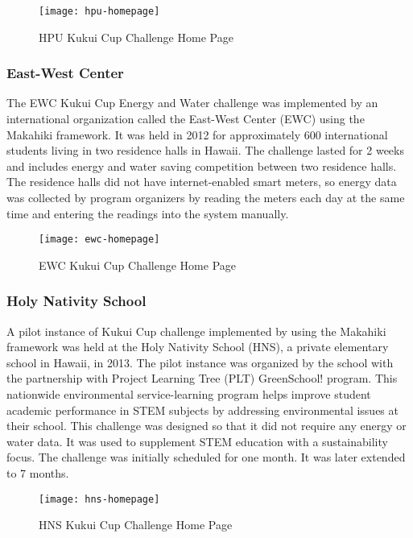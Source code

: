 \begin{figure}[ht!]
   \centering
   \texttt{[image: hpu-homepage]}
   \caption{HPU Kukui Cup Challenge Home Page}
   \label{fig:hpu-homepage}
\end{figure}

\subsubsection{East-West Center}

The EWC Kukui Cup Energy and Water challenge was implemented by an international organization called the East-West Center (EWC) using the Makahiki framework. It was held in 2012 for approximately 600 international students living in two residence halls in Hawaii. The challenge lasted for 2 weeks and includes energy and water saving competition between two residence halls. The residence halls did not have internet-enabled smart meters, so energy data was collected by program organizers by reading the meters each day at the same time and entering the readings into the system manually.

\begin{figure}[ht!]
   \centering
   \texttt{[image: ewc-homepage]}
   \caption{EWC Kukui Cup Challenge Home Page}
   \label{fig:ewc-homepage}
\end{figure}

\subsubsection{Holy Nativity School}

A pilot instance of Kukui Cup challenge implemented by using the Makahiki framework was held at the Holy Nativity School (HNS), a private elementary school in Hawaii, in 2013. The pilot instance was organized by the school with the partnership with Project Learning Tree (PLT) GreenSchool! program\cite{plt-greenschools}. This nationwide environmental service-learning program helps improve student academic performance in STEM subjects by addressing environmental issues at their school. This challenge was designed so that it did not require any energy or water data. It was used to supplement STEM education with a sustainability focus. The challenge was initially scheduled for one month. It was later extended to 7 months.

\begin{figure}[ht!]
   \centering
   \texttt{[image: hns-homepage]}
   \caption{HNS Kukui Cup Challenge Home Page}
   \label{fig:hns-homepage}
\end{figure}

